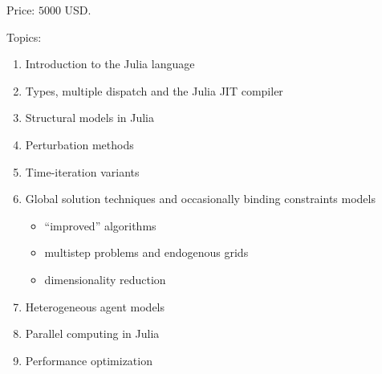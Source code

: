 \documentclass[12pt]{article}
\begin{document}
Price: $5000$ USD.

Topics:
%
\begin{enumerate}
    \item Introduction to the Julia language
    \item Types, multiple dispatch and the Julia JIT compiler
    \item Structural models in Julia
    \item Perturbation methods
    \item Time-iteration variants
    \item Global solution techniques and occasionally binding constraints models
    \begin{itemize}
        \item ``improved'' algorithms
        \item multistep problems and endogenous grids
        \item dimensionality reduction
    \end{itemize}
    \item Heterogeneous agent models
    \item Parallel computing in Julia
    \item Performance optimization
\end{enumerate}
\end{document}
